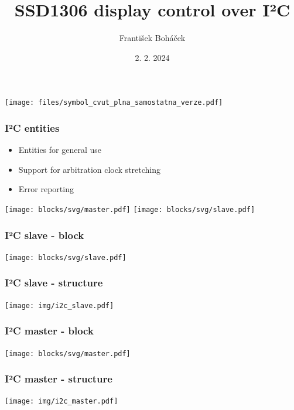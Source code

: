 \documentclass{beamer}
\author[František Boháček]{František Boháček}
\title[NSV semestral project]{SSD1306 display control over I²C}
\date[2. 2. 2024]{2. 2. 2024}
\begin{document}
\begin{frame}
    \titlepage
    \begin{center}
          \texttt{[image: files/symbol\_cvut\_plna\_samostatna\_verze.pdf]}
    \end{center}
\end{frame}

\begin{frame}
    \frametitle{I²C entities}

    \begin{itemize}
      \item Entities for general use
      \item Support for arbitration clock stretching
      \item Error reporting
    \end{itemize}

    \begin{center}
      \texttt{[image: blocks/svg/master.pdf]}
      \texttt{[image: blocks/svg/slave.pdf]}
    \end{center}
\end{frame}

\begin{frame}
  \frametitle{I²C slave - block}

  \begin{center}
    \hspace{1.8cm}
    \texttt{[image: blocks/svg/slave.pdf]}
  \end{center}
\end{frame}

\begin{frame}
  \frametitle{I²C slave - structure}

  \begin{center}
    \texttt{[image: img/i2c\_slave.pdf]}
  \end{center}
\end{frame}

\begin{frame}
  \frametitle{I²C master - block}

  \begin{center}
    \hspace{1.5cm}
    \texttt{[image: blocks/svg/master.pdf]}
  \end{center}
\end{frame}

\begin{frame}
  \frametitle{I²C master - structure}

  \begin{center}
    \texttt{[image: img/i2c\_master.pdf]}
  \end{center}
\end{frame}
\end{document}
